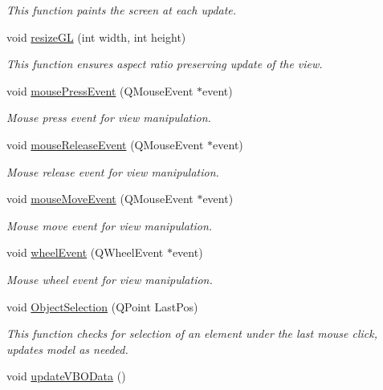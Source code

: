 \begin{DoxyCompactItemize}
\begin{DoxyCompactList}\small\item\em This function paints the screen at each update. \end{DoxyCompactList}\item 
void \hyperlink{classGLWidget_ac0d2a8ecf60907a81c0d73475d851025}{resize\+G\+L} (int width, int height)
\begin{DoxyCompactList}\small\item\em This function ensures aspect ratio preserving update of the view. \end{DoxyCompactList}\item 
void \hyperlink{classGLWidget_ab144cc8064c1bbf6d0ef0646ca0bd06c}{mouse\+Press\+Event} (Q\+Mouse\+Event $\ast$event)
\begin{DoxyCompactList}\small\item\em Mouse press event for view manipulation. \end{DoxyCompactList}\item 
void \hyperlink{classGLWidget_ab992c4c25439a5ef23031991015451c1}{mouse\+Release\+Event} (Q\+Mouse\+Event $\ast$event)
\begin{DoxyCompactList}\small\item\em Mouse release event for view manipulation. \end{DoxyCompactList}\item 
void \hyperlink{classGLWidget_a9043bac13d6f0a5307ea5c7f9b3caa50}{mouse\+Move\+Event} (Q\+Mouse\+Event $\ast$event)
\begin{DoxyCompactList}\small\item\em Mouse move event for view manipulation. \end{DoxyCompactList}\item 
void \hyperlink{classGLWidget_a5702a23f7cf42d05fe55a417d810a4b6}{wheel\+Event} (Q\+Wheel\+Event $\ast$event)
\begin{DoxyCompactList}\small\item\em Mouse wheel event for view manipulation. \end{DoxyCompactList}\item 
void \hyperlink{classGLWidget_af102973086f831f0a27b3458c57bb337}{Object\+Selection} (Q\+Point Last\+Pos)
\begin{DoxyCompactList}\small\item\em This function checks for selection of an element under the last mouse click, updates model as needed. \end{DoxyCompactList}\item 
\hypertarget{classGLWidget_a040b04f3707c01014977d6465bb441c0}{}void \hyperlink{classGLWidget_a040b04f3707c01014977d6465bb441c0}{update\+V\+B\+O\+Data} ()\label{classGLWidget_a040b04f3707c01014977d6465bb441c0}


\end{DoxyCompactItemize}

